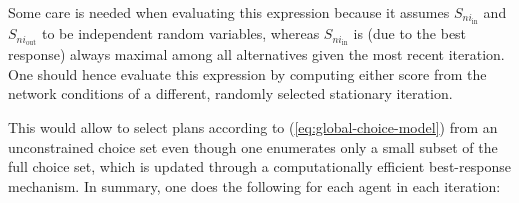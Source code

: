 Some care is needed when evaluating this expression because it assumes
$S_{ni_{\text{in}}}$ and $S_{ni_{\text{out}}}$ to be independent
random variables, whereas $S_{ni_{\text{in}}}$ is (due to the best
response) always maximal among all alternatives given the most recent
iteration. One should hence evaluate this expression by computing
either score from the network conditions of
%
%
a different, randomly selected stationary iteration.
%

This would allow to select plans according to (\ref{eq:global-choice-model})
from an unconstrained choice set even though one enumerates only a
small subset of the full choice set, which is updated through a computationally
efficient best-response mechanism.
%
%
%
In summary, one does the following
for each agent in each iteration:
